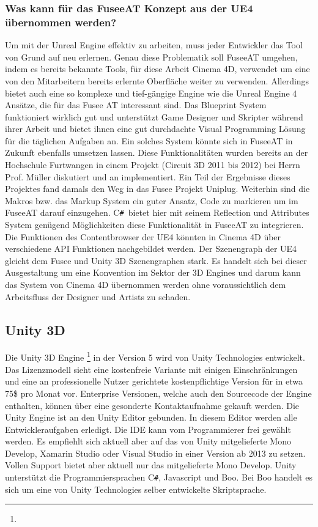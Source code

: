 \documentclass[pagesize, paper=a4, fontsize=12pt, titlepage=true, headings=small, headnosepline, abstractoff, liststotoc, nochapterprefix, plainheadsepline, twoside]{scrreprt}
\newcommand{\CS}{C\texttt{\#}}
\newcommand{\CSS}{C\texttt{\# }}
\begin{document}
\subsubsection{Was kann für das FuseeAT Konzept aus der UE4 übernommen werden?}
Um mit der Unreal Engine effektiv zu arbeiten, muss jeder Entwickler das Tool von Grund auf neu erlernen. Genau diese Problematik soll FuseeAT umgehen, indem es bereits bekannte Tools, für diese Arbeit Cinema 4D, verwendet um eine von den Mitarbeitern bereits erlernte Oberfläche weiter zu verwenden. Allerdings bietet auch eine so komplexe und tief-gängige Engine wie die Unreal Engine 4 Ansätze, die für das Fusee AT interessant sind. Das Blueprint System funktioniert wirklich gut und unterstützt Game Designer und Skripter während ihrer Arbeit und bietet ihnen eine gut durchdachte Visual Programming Lösung für die täglichen Aufgaben an. Ein solches System könnte sich in FuseeAT in Zukunft ebenfalls umsetzen lassen. Diese Funktionalitäten wurden bereits an der Hochschule Furtwangen in einem Projekt (Circuit 3D 2011 bis 2012) bei Herrn Prof. Müller diskutiert und an implementiert. Ein Teil der Ergebnisse dieses Projektes fand damals den Weg in das Fusee Projekt Uniplug.
Weiterhin sind die Makros bzw. das Markup System ein guter Ansatz, Code zu markieren um im FuseeAT darauf einzugehen. \CSS bietet hier mit seinem Reflection und Attributes System genügend Möglichkeiten diese Funktionalität in FuseeAT zu integrieren. Die Funktionen des Contentbrowser der UE4 könnten in Cinema 4D über verschiedene API Funktionen nachgebildet werden. Der Szenengraph der UE4 gleicht dem Fusee und Unity 3D Szenengraphen stark. Es handelt sich bei dieser Ausgestaltung um eine Konvention im Sektor der 3D Engines und darum kann das System von Cinema 4D übernommen werden ohne voraussichtlich dem Arbeitsfluss der Designer und Artists zu schaden.

\subsection{Unity 3D}
Die Unity 3D Engine \footnote{} in der Version 5 wird von Unity Technologies entwickelt. Das Lizenzmodell sieht eine kostenfreie Variante mit einigen Einschränkungen und eine an professionelle Nutzer gerichtete kostenpflichtige Version für in etwa 75\$ pro Monat vor. Enterprise Versionen, welche auch den Sourcecode der Engine enthalten, können über eine gesonderte Kontaktaufnahme gekauft werden. Die Unity Engine ist an den Unity Editor gebunden. In diesem Editor werden alle Entwickleraufgaben erledigt. Die IDE kann vom Programmierer frei gewählt werden. Es empfiehlt sich aktuell aber auf das von Unity mitgelieferte Mono Develop, Xamarin Studio oder Visual Studio in einer Version ab 2013 zu setzen. Vollen Support bietet aber aktuell nur das mitgelieferte Mono Develop. Unity unterstützt die Programmiersprachen \CS, Javascript und Boo. Bei Boo handelt es sich um eine von Unity Technologies selber entwickelte Skriptsprache.
\end{document}
